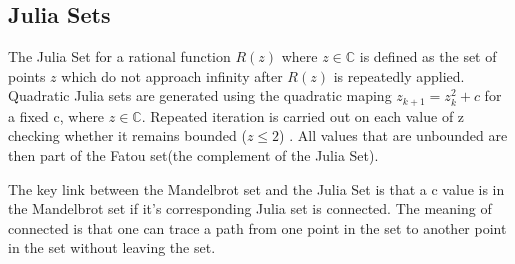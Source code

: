 \documentclass[a4wide, 10pt]{article}
\begin{document}
\subsection{Julia Sets}


The Julia Set for a rational function $R(z)$ where $z \in \mathbb{C}$  is defined as the set of points $z$ which do not approach infinity after $R(z)$ is repeatedly applied. \cite{Julia definition}
\\Quadratic Julia sets are generated using the quadratic maping $z_{k+1} = z_{k}^{2} + c$ for a fixed c, where $z \in \mathbb{C}$. Repeated iteration is carried out on each value of z checking
    whether it remains bounded ($z \leq 2$) . All values that are unbounded are
     then part of the Fatou set(the complement of the Julia Set).
   
    
The key link between the Mandelbrot set and the Julia Set is that a c value is in the
 Mandelbrot set if it's corresponding Julia set is connected. The meaning of
  connected is that one can trace a path from one point in the set to another point
   in the set without leaving the set. 

\end{document}
